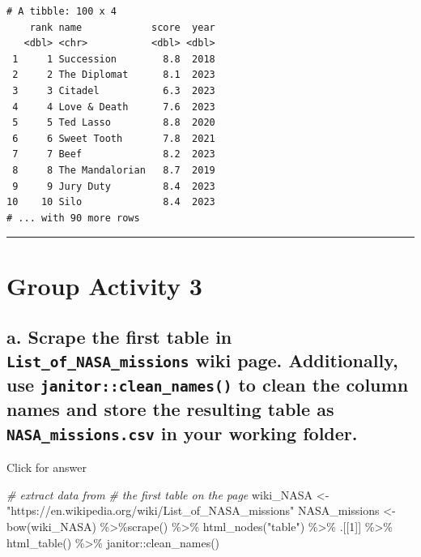 \documentclass[
]{book}
\newenvironment{Shaded}{\begin{snugshade}}{\end{snugshade}}
\newcommand{\CommentTok}[1]{\textcolor[rgb]{0.56,0.35,0.01}{\textit{#1}}}
\newcommand{\DecValTok}[1]{\textcolor[rgb]{0.00,0.00,0.81}{#1}}
\newcommand{\FunctionTok}[1]{\textcolor[rgb]{0.00,0.00,0.00}{#1}}
\newcommand{\NormalTok}[1]{#1}
\newcommand{\OtherTok}[1]{\textcolor[rgb]{0.56,0.35,0.01}{#1}}
\newcommand{\SpecialCharTok}[1]{\textcolor[rgb]{0.00,0.00,0.00}{#1}}
\newcommand{\StringTok}[1]{\textcolor[rgb]{0.31,0.60,0.02}{#1}}
\begin{document}
\begin{verbatim}
# A tibble: 100 x 4
    rank name            score  year
   <dbl> <chr>           <dbl> <dbl>
 1     1 Succession        8.8  2018
 2     2 The Diplomat      8.1  2023
 3     3 Citadel           6.3  2023
 4     4 Love & Death      7.6  2023
 5     5 Ted Lasso         8.8  2020
 6     6 Sweet Tooth       7.8  2021
 7     7 Beef              8.2  2023
 8     8 The Mandalorian   8.7  2019
 9     9 Jury Duty         8.4  2023
10    10 Silo              8.4  2023
# ... with 90 more rows
\end{verbatim}

\begin{center}\rule{0.5\linewidth}{0.5pt}\end{center}

\hypertarget{group-activity-3-1}{%
\section{Group Activity 3}\label{group-activity-3-1}}

\hypertarget{a.-scrape-the-first-table-in-list_of_nasa_missions-wiki-page.-additionally-use-janitorclean_names-to-clean-the-column-names-and-store-the-resulting-table-as-nasa_missions.csv-in-your-working-folder.}{%
\subsection{\texorpdfstring{a. Scrape the first table in \texttt{List\_of\_NASA\_missions} wiki page. Additionally, use \texttt{janitor::clean\_names()} to clean the column names and store the resulting table as \texttt{NASA\_missions.csv} in your working folder.}{a. Scrape the first table in List\_of\_NASA\_missions wiki page. Additionally, use janitor::clean\_names() to clean the column names and store the resulting table as NASA\_missions.csv in your working folder.}}\label{a.-scrape-the-first-table-in-list_of_nasa_missions-wiki-page.-additionally-use-janitorclean_names-to-clean-the-column-names-and-store-the-resulting-table-as-nasa_missions.csv-in-your-working-folder.}}

Click for answer

\begin{Shaded}
\begin{Highlighting}[]
\CommentTok{\# extract data from }
\CommentTok{\# the first table on the page}
\NormalTok{wiki\_NASA }\OtherTok{\textless{}{-}} \StringTok{"https://en.wikipedia.org/wiki/List\_of\_NASA\_missions"}
\NormalTok{NASA\_missions }\OtherTok{\textless{}{-}} \FunctionTok{bow}\NormalTok{(wiki\_NASA) }\SpecialCharTok{\%\textgreater{}\%}\FunctionTok{scrape}\NormalTok{() }\SpecialCharTok{\%\textgreater{}\%} 
  \FunctionTok{html\_nodes}\NormalTok{(}\StringTok{"table"}\NormalTok{) }\SpecialCharTok{\%\textgreater{}\%} 
\NormalTok{  .[[}\DecValTok{1}\NormalTok{]] }\SpecialCharTok{\%\textgreater{}\%} 
  \FunctionTok{html\_table}\NormalTok{() }\SpecialCharTok{\%\textgreater{}\%} 
\NormalTok{  janitor}\SpecialCharTok{::}\FunctionTok{clean\_names}\NormalTok{()}
\end{Highlighting}
\end{Shaded}
\end{document}
